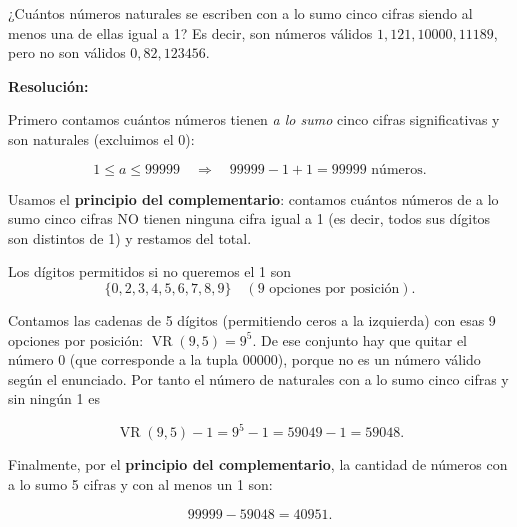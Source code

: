 \documentclass[a4paper,12pt]{article}
\begin{document}
\begin{ejercicio}[title=Ejercicio 12]
¿Cuántos números naturales se escriben con a lo sumo cinco cifras siendo al menos una de ellas igual a 1? Es decir, son números válidos $1, 121, 10000, 11189$, pero no son válidos $0, 82, 123456$.

\tcblower
\textbf{Resolución:}

Primero contamos cuántos números tienen \emph{a lo sumo} cinco cifras significativas y son naturales (excluimos el 0):

\[
1 \le a \le 99999 \quad\Longrightarrow\quad 99999 - 1 + 1 = 99999 \text{ números.}
\]

Usamos el \textbf{principio del complementario}: contamos cuántos números de a lo sumo cinco cifras NO tienen ninguna cifra igual a 1 (es decir, todos sus dígitos son distintos de 1) y restamos del total.

Los dígitos permitidos si no queremos el 1 son
\[
\{0,2,3,4,5,6,7,8,9\}\quad(\text{9 opciones por posición}).
\]

Contamos las cadenas de 5 dígitos (permitiendo ceros a la izquierda) con esas 9 opciones por posición: \(\operatorname{VR}(9,5)=9^5\).  
De ese conjunto hay que quitar el número 0 (que corresponde a la tupla \(00000\)), porque no es un número válido según el enunciado. Por tanto el número de naturales con a lo sumo cinco cifras y sin ningún 1 es

\[
\operatorname{VR}(9,5) - 1 = 9^5 - 1 = 59049 - 1 = 59048.
\]

Finalmente, por el \textbf{principio del complementario}, la cantidad de números con a lo sumo 5 cifras y con al menos un 1 son:

\[
99999 - 59048 = \boxed{40951}.
\]

\end{ejercicio}
\end{document}
